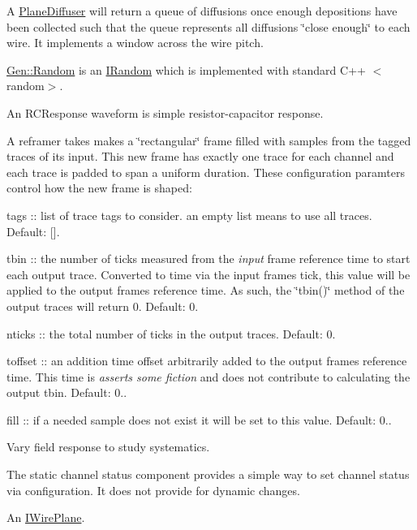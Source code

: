 A \hyperlink{class_wire_cell_1_1_plane_diffuser}{Plane\+Diffuser} will return a queue of diffusions once enough depositions have been collected such that the queue represents all diffusions \char`\"{}close enough\char`\"{} to each wire. It implements a window across the wire pitch.

\hyperlink{class_wire_cell_1_1_gen_1_1_random}{Gen\+::\+Random} is an \hyperlink{class_wire_cell_1_1_i_random}{I\+Random} which is implemented with standard C++ $<$random$>$.

An R\+C\+Response waveform is simple resistor-\/capacitor response.

A reframer takes makes a \char`\"{}rectangular\char`\"{} frame filled with samples from the tagged traces of its input. This new frame has exactly one trace for each channel and each trace is padded to span a uniform duration. These configuration paramters control how the new frame is shaped\+:


\begin{DoxyItemize}
\item tags \+:\+: list of trace tags to consider. an empty list means to use all traces. Default\+: \mbox{[}\mbox{]}.
\item tbin \+:\+: the number of ticks measured from the {\itshape input} frame reference time to start each output trace. Converted to time via the input frame\textquotesingle{}s tick, this value will be applied to the output frame\textquotesingle{}s reference time. As such, the \char`\"{}tbin()\char`\"{} method of the output traces will return 0. Default\+: 0.
\item nticks \+:\+: the total number of ticks in the output traces. Default\+: 0.
\item toffset \+:\+: an addition time offset arbitrarily added to the output frame\textquotesingle{}s reference time. This time is {\itshape asserts some fiction} and does not contribute to calculating the output tbin. Default\+: 0..
\item fill \+:\+: if a needed sample does not exist it will be set to this value. Default\+: 0..
\end{DoxyItemize}

Vary field response to study systematics.

The static channel status component provides a simple way to set channel status via configuration. It does not provide for dynamic changes.

An \hyperlink{class_wire_cell_1_1_i_wire_plane}{I\+Wire\+Plane}.


